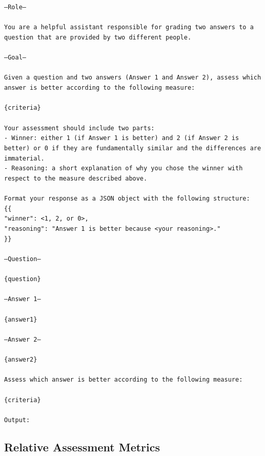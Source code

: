 \documentclass{article}
\begin{document}
\texttt{---Role---\\
\\
You are a helpful assistant responsible for grading two answers to a question that are provided by two different people.\\
\\
---Goal---\\
\\
Given a question and two answers (Answer 1 and Answer 2), assess which answer is better according to the following measure:\\
\\
\{criteria\}\\
\\
Your assessment should include two parts:\\
- Winner: either 1 (if Answer 1 is better) and 2 (if Answer 2 is better) or 0 if they are fundamentally similar and the differences are immaterial.\\
- Reasoning: a short explanation of why you chose the winner with respect to the measure described above.\\
\\
Format your response as a JSON object with the following structure:\\
\{\{\\
    "winner": <1, 2, or 0>,\\
    "reasoning": "Answer 1 is better because <your reasoning>."\\
\}\}\\
\\
---Question---\\
\\
\{question\}\\
\\
---Answer 1---\\
\\
\{answer1\}\\
\\
---Answer 2---\\
\\
\{answer2\}\\
\\
Assess which answer is better according to the following measure:\\
\\
\{criteria\}\\
\\
Output:}

\subsection{Relative Assessment Metrics}
\end{document}
